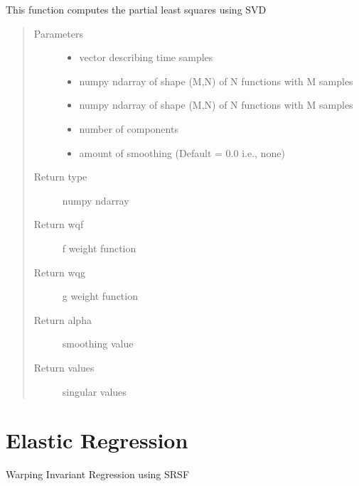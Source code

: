 \documentclass[letterpaper,10pt,english]{sphinxmanual}
\begin{document}
\begin{fulllineitems}
\label{\detokenize{fPLS:fPLS.pls_svd}}
This function computes the partial least squares using SVD
\begin{quote}\begin{description}
\item[{Parameters}] \leavevmode\begin{itemize}
\item {} 
 \textendash{} vector describing time samples

\item {} 
 \textendash{} numpy ndarray of shape (M,N) of N functions with M samples

\item {} 
 \textendash{} numpy ndarray of shape (M,N) of N functions with M samples

\item {} 
 \textendash{} number of components

\item {} 
 \textendash{} amount of smoothing (Default = 0.0 i.e., none)

\end{itemize}

\item[{Return type}] \leavevmode
numpy ndarray

\item[{Return wqf}] \leavevmode
f weight function

\item[{Return wqg}] \leavevmode
g weight function

\item[{Return alpha}] \leavevmode
smoothing value

\item[{Return values}] \leavevmode
singular values

\end{description}\end{quote}

\end{fulllineitems}



\chapter{Elastic Regression}
\label{\detokenize{regression:module-regression}}\label{\detokenize{regression:elastic-regression}}\label{\detokenize{regression::doc}}
Warping Invariant Regression using SRSF
\end{document}
